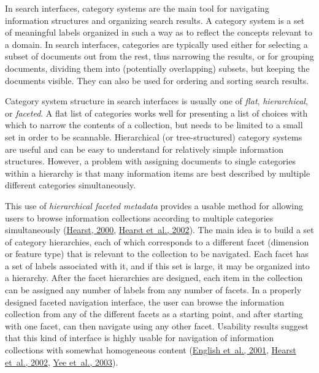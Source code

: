 \documentclass[sigconf,nonacm,screen,pbalance]{acmart}
\begin{document}
In search interfaces, category systems are the main tool for navigating information structures and
organizing search results. A category system is a set of meaningful labels organized in such a way as to
reflect the concepts relevant to a domain. In search interfaces, categories are typically used either
for selecting a subset of documents out from the rest, thus narrowing the results, or for grouping
documents, dividing them into (potentially overlapping) subsets, but keeping the documents visible. They
can also be used for ordering and sorting search results.

Category system structure in search interfaces is usually one of {\em  flat}, {\em  hierarchical}, or
{\em  faceted}. A flat list of categories works well for presenting a list of choices with which to
narrow the contents of a collection, but needs to be limited to a small set in order to be scannable.
Hierarchical (or tree-structured) category systems are useful and can be easy to understand for
relatively simple information structures. However, a problem with assigning documents to single
categories within a hierarchy is that many information items are best described by multiple different
categories simultaneously.

This use of {\em  hierarchical faceted metadata} provides a usable method for allowing users to browse
information collections according to multiple categories simultaneously (\href{https://searchuserinterfaces.com/book/sui_references.html#hearst2000ngw}{Hearst, 2000}, \href{https://searchuserinterfaces.com/book/sui_references.html#hearst02}{ Hearst et~al., 2002}). The main idea is
to build a set of category hierarchies, each of which corresponds to a different facet (dimension or
feature type) that is relevant to the collection to be navigated. Each facet has a set of labels
associated with it, and if this set is large, it may be organized into a hierarchy. After the facet
hierarchies are designed, each item in the collection can be assigned any number of labels from any
number of facets. In a properly designed faceted navigation interface, the user can browse the
information collection from any of the different facets as a starting point, and after starting with one
facet, can then navigate using any other facet. Usability results suggest that this kind of interface is
highly usable for navigation of information collections with somewhat homogeneous content (\href{https://searchuserinterfaces.com/book/sui_references.html#flamenco01}{English et~al., 2001}, \href{https://searchuserinterfaces.com/book/sui_references.html#hearst02}{ Hearst et~al., 2002}, \href{https://searchuserinterfaces.com/book/sui_references.html#yee03}{ Yee et~al., 2003}).
\end{document}
